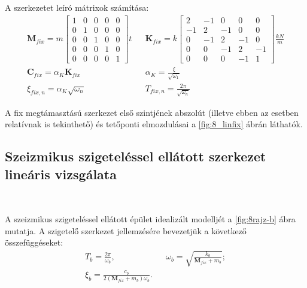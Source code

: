 A szerkezetet leíró mátrixok számítása:
\begin{align*}
  & \mathbf{M}_{fix}  = m\left[\begin{array}{rrrrr}  1 & 0 & 0 & 0 & 0  \\ 0 & 1 & 0 & 0 & 0 \\ 0 & 0 & 1 & 0 & 0 \\ 0 & 0 & 0 & 1 & 0 \\ 0 & 0 & 0 & 0 & 1  \end{array} \right] t   &  & \mathbf{K}_{fix} = k \left[\begin{array}{rrrrr} 2 & -1 & 0 & 0 & 0  \\ -1 & 2 & -1 & 0 & 0 \\ 0 & -1 &2 & -1 & 0 \\ 0 & 0 & -1 & 2 & -1 \\ 0 & 0 & 0 & -1 & 1 \end{array} \right]\frac{kN}{m}  &  \\
  & \mathbf{C}_{fix}  = \alpha_K\mathbf{K}_{fix}  &  & \alpha_K = \frac{\xi}{\sqrt{\omega_1}} & \\
  & \xi_{fix,n} = \alpha_K\sqrt{\omega_n}& & T_{fix,n} = \frac{2\pi}{\sqrt{\omega_n}} &  
\end{align*} 




A fix megtámasztású szerkezet első szintjének abszolút (illetve ebben az esetben relatívnak is tekinthető) és tetőponti elmozdulásai a \ref{fig:8_linfix} ábrán láthatók.



\subsection{Szeizmikus szigeteléssel ellátott szerkezet lineáris vizsgálata}

{\ }

A szeizmikus szigeteléssel ellátott épület idealizált modelljét a \ref{fig:8rajz-b} ábra mutatja. A szigetelő szerkezet jellemzésére bevezetjük a következő összefüggéseket:
\begin{subequations}
\label{eq:tb}
\begin{align}
& T_b = \frac{2\pi}{\omega_b}, &  & \omega_b = \sqrt{\frac{k_b}{\mathbf{M}_{fix}+m_b}}; & \\
& \xi_b = \frac{c_b}{2(\mathbf{M}_{fix}+m_b)\omega_b}.&
\end{align}
\end{subequations}

